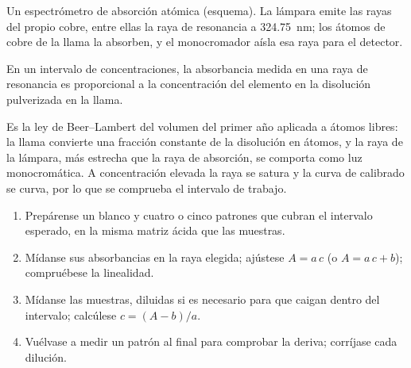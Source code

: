 \begin{omfigure}
\par\vspace{4pt}

{\small Un espectrómetro de absorción atómica (esquema). La lámpara emite las rayas del propio cobre, entre
ellas la raya de resonancia a \qty{324.75}{nm}; los átomos de cobre de la llama la absorben, y el
monocromador aísla esa raya para el detector.}
\end{omfigure}

\begin{proposition}\label{prop:b2:mass-spec-atomic:aas}
En un intervalo de concentraciones, la absorbancia medida en una raya de resonancia es proporcional a la
concentración del elemento en la disolución pulverizada en la llama.
\end{proposition}

\admitted

Es la ley de Beer--Lambert del volumen del primer año aplicada a átomos libres: la llama convierte una fracción
constante de la disolución en átomos, y la raya de la lámpara, más estrecha que la raya de absorción, se comporta como
luz monocromática. A concentración elevada la raya se satura y la curva de calibrado se curva, por lo que
se comprueba el intervalo de trabajo.

\begin{method}\label{met:b2:mass-spec-atomic:aas-calibration}
\begin{enumerate}
  \item Prepárense un blanco y cuatro o cinco patrones que cubran el intervalo esperado, en la misma matriz ácida
        que las muestras.
  \item Mídanse sus absorbancias en la raya elegida; ajústese $A = a\,c$ (o $A = a\,c + b$); compruébese la
        linealidad.
  \item Mídanse las muestras, diluidas si es necesario para que caigan dentro del intervalo; calcúlese $c = (A - b)/a$.
  \item Vuélvase a medir un patrón al final para comprobar la deriva; corríjase cada dilución.
\end{enumerate}
\end{method}

